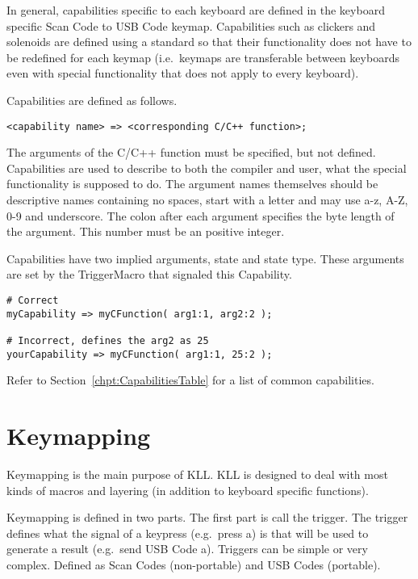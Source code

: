 \documentclass{kiibohd-template}
\begin{document}
In general, capabilities specific to each keyboard are defined in the keyboard specific Scan Code to USB Code keymap.
Capabilities such as clickers and solenoids are defined using a standard so that their functionality does not have to be redefined for each keymap (i.e.\ keymaps are transferable between keyboards even with special functionality that does not apply to every keyboard).

Capabilities are defined as follows.

\begin{lstlisting}
<capability name> => <corresponding C/C++ function>;
\end{lstlisting}

The arguments of the C/C++ function must be specified, but not defined.
Capabilities are used to describe to both the compiler and user, what the special functionality is supposed to do.
The argument names themselves should be descriptive names containing no spaces, start with a letter and may use a-z, A-Z, 0-9 and underscore.
The colon after each argument specifies the byte length of the argument.
This number must be an positive integer.

Capabilities have two implied arguments, state and state type.
These arguments are set by the TriggerMacro that signaled this Capability.

\begin{lstlisting}
# Correct
myCapability => myCFunction( arg1:1, arg2:2 );

# Incorrect, defines the arg2 as 25
yourCapability => myCFunction( arg1:1, 25:2 );
\end{lstlisting}

Refer to Section~\ref{chpt:CapabilitiesTable} for a list of common capabilities.


\chapter{Keymapping}

Keymapping is the main purpose of KLL.
KLL is designed to deal with most kinds of macros and layering (in addition to keyboard specific functions).

Keymapping is defined in two parts.
The first part is call the trigger.
The trigger defines what the signal of a keypress (e.g.\ press a) is that will be used to generate a result (e.g.\ send USB Code a).
Triggers can be simple or very complex.
Defined as Scan Codes (non-portable) and USB Codes (portable).
\end{document}
